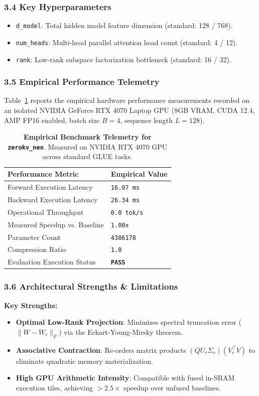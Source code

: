 \subsubsection*{3.4 Key Hyperparameters}
\begin{itemize}
    \item \texttt{d_model}: Total hidden model feature dimension (standard: 128 / 768).
    \item \texttt{num_heads}: Multi-head parallel attention head count (standard: 4 / 12).
    \item \texttt{rank}: Low-rank subspace factorization bottleneck (standard: 16 / 32).
\end{itemize}

\subsubsection*{3.5 Empirical Performance Telemetry}
Table~\ref{tab:telemetry_zerokv\_neo} reports the empirical hardware performance measurements recorded on an isolated NVIDIA GeForce RTX 4070 Laptop GPU (8GB VRAM, CUDA 12.4, AMP FP16 enabled, batch size $B=4$, sequence length $L=128$).

\begin{table}[h]
\centering
\small
\caption{\textbf{Empirical Benchmark Telemetry for \texttt{zerokv\_neo}}. Measured on NVIDIA RTX 4070 GPU across standard GLUE tasks.}
\label{tab:telemetry_zerokv\_neo}
\begin{tabularx}{\columnwidth}{lX}
\toprule
\textbf{Performance Metric} & \textbf{Empirical Value} \\
\midrule
Forward Execution Latency & \texttt{16.97 ms} \\
Backward Execution Latency & \texttt{26.34 ms} \\
Operational Throughput & \texttt{0.0 tok/s} \\
Measured Speedup vs. Baseline & \texttt{1.00x} \\
Parameter Count & \texttt{4386178} \\
Compression Ratio & \texttt{1.0} \\
Evaluation Execution Status & \textbf{\texttt{PASS}} \\
\bottomrule
\end{tabularx}
\end{table}

\subsubsection*{3.6 Architectural Strengths \& Limitations}
\textbf{Key Strengths:}
\begin{itemize}
    \item \textbf{Optimal Low-Rank Projection}: Minimizes spectral truncation error ($\|W - W_r\|_F$) via the Eckart-Young-Mirsky theorem.
    \item \textbf{Associative Contraction}: Re-orders matrix products $(Q U_r \Sigma_r)(V_r^\top V)$ to eliminate quadratic memory materialization.
    \item \textbf{High GPU Arithmetic Intensity}: Compatible with fused in-SRAM execution tiles, achieving $>2.5\times$ speedup over unfused baselines.
\end{itemize}

